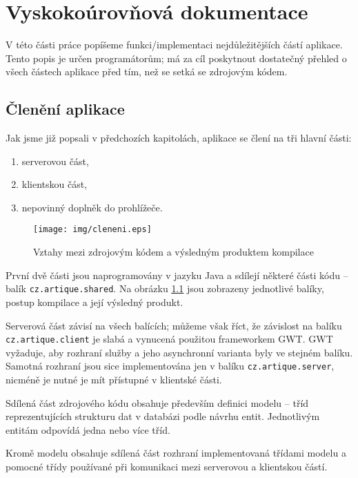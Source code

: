 \chapter{Vyskokoúrovňová dokumentace}

V této části práce popíšeme funkci/implementaci nejdůležitějších částí aplikace.
Tento popis je určen programátorům; má za cíl poskytnout dostatečný přehled o všech částech aplikace před tím, než se setká se zdrojovým kódem.

\section{Členění aplikace}

Jak jsme již popsali v předchozích kapitolách, aplikace se člení na tři hlavní části:
\begin{enumerate}
	\item serverovou část,
	\item klientskou část,
	\item nepovinný doplněk do prohlížeče.
\end{enumerate}

\begin{figure}
    \centering
    \texttt{[image: img/cleneni.eps]}
    \caption{Vztahy mezi zdrojovým kódem a výsledným produktem kompilace}
    \label{fig:cleneni}
\end{figure}

První dvě části jsou naprogramovány v jazyku Java a sdílejí některé části kódu -- balík \verb|cz.artique.shared|.
Na obrázku \ref{fig:cleneni} jsou zobrazeny jednotlivé balíky, postup kompilace a její výsledný produkt.

Serverová část závisí na všech balících; můžeme však říct, že závislost na balíku \verb|cz.artique.client| je slabá a vynucená použitou frameworkem GWT.
GWT vyžaduje, aby rozhraní služby a jeho asynchronní varianta byly ve stejném balíku.
Samotná rozhraní jsou sice implementována jen v balíku \verb|cz.artique.server|, nicméně je nutné je mít přístupné v klientské části.

Sdílená část zdrojového kódu obsahuje především definici modelu -- tříd reprezentujících strukturu dat v databázi podle návrhu entit.
Jednotlivým entitám odpovídá jedna nebo více tříd.

Kromě modelu obsahuje sdílená část rozhraní implementovaná třídami modelu a pomocné třídy používané při komunikaci mezi serverovou a klientskou částí.

\bigskip

